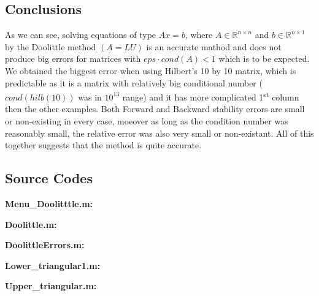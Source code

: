 \documentclass[12pt]{article}
\begin{document}
\begin{center}
\section{Conclusions}
\end{center}

\begin{flushleft}
As we can see, solving equations of type $Ax=b$, where $A \in \mathbb R^{n \times n}$ and $b \in \mathbb R^{n \times 1}$ by the Doolittle method $(A=LU)$ is an accurate mathod and does not produce big errors for matrices with $eps\cdot cond(A) < 1$ which is to be expected.
We obtained the biggest error when using Hilbert's 10 by 10 matrix, which is predictable as it is a matrix with relatively big conditional number ($cond(hilb(10))$ was in  $10^{13}$ range) and it has more complicated 1\textsuperscript{st} column then the other examples. Both Forward and Backward stability errors are small or non-existing in every case, moeover as long as the condition number was reasonably small, the relative error was also very small or non-existant. All of this together suggests that the method is quite accurate.	
\end{flushleft}

\pagebreak

\begin{center}
\item \section{Source Codes}
\end{center}


{\bf Menu\_Doolitttle.m:}


\medskip 
{\bf Doolittle.m:}


\medskip 
{\bf DoolittleErrors.m:}


\medskip
 {\bf Lower\_triangular1.m:}


\medskip
{\bf Upper\_triangular.m:}

\end{document}
